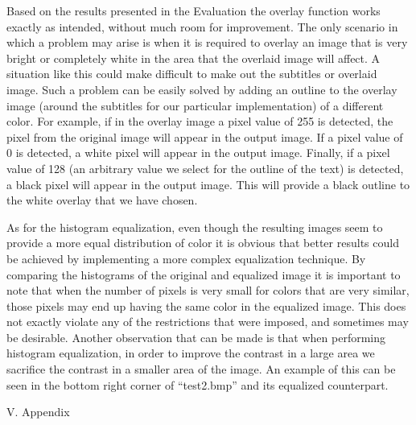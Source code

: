 \documentclass{article}
\begin{document}
\begin{multicols*}{2}
Based on the results presented in the Evaluation the overlay function works exactly as intended, without much room for improvement. The only scenario in which a problem may arise is when it is required to overlay an image that is very bright or completely white in the area that the overlaid image will affect. A situation like this could make difficult to make out the subtitles or overlaid image. Such a problem can be easily solved by adding an outline to the overlay image (around the subtitles for our particular implementation) of a different color. For example, if in the overlay image a pixel value of 255 is detected, the pixel from the original image will appear in the output image. If a pixel value of  0 is detected, a white pixel will appear in the output image. Finally, if a pixel value of 128 (an arbitrary value we select for the outline of the text) is detected, a black pixel will appear in the output image. This will provide a black outline to the white overlay that we have chosen.

As for the histogram equalization, even though the resulting images seem to provide a more equal distribution of color it is obvious that better results could be achieved by implementing a more complex equalization technique. By comparing the histograms of the original and equalized image it is important to note that when the number of pixels is very small for colors that are very similar, those pixels may end up having the same color in the equalized image. This does not exactly violate any of the restrictions that were imposed, and sometimes may be desirable. Another observation that can be made is that when performing histogram equalization, in order to improve the contrast in a large area we sacrifice the contrast in a smaller area of the image. An example of this can be seen in the bottom right corner of “test2.bmp” and its equalized counterpart.



\begin{center}
{\large V. Appendix}
\end{center}

\end{multicols*}
\end{document}
